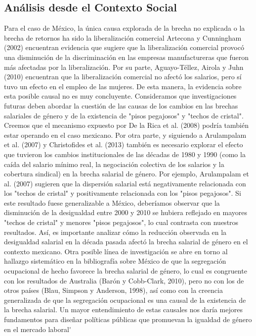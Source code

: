\subsection{An\'alisis desde el Contexto Social}
Para el caso de M\'exico, la \'unica causa explorada de la brecha no explicada o la brecha de retornos ha sido la liberalizaci\'on comercial Artecona y Cunningham (2002) encuentran evidencia que sugiere que la liberalizaci\'on comercial provoc\'o una disminuci\'on de la discriminaci\'on en las empresas manufactureras que fueron más afectadas por la liberalizaci\'on. Por su parte, Aguayo-T\'ellez, Airola y Juhn (2010) encuentran que la liberalizaci\'on comercial no afect\'o los salarios, pero s\'i tuvo un efecto en el empleo de las mujeres. De esta manera, la evidencia sobre esta posible causal no es muy concluyente. Consideramos que investigaciones futuras deben abordar la cuesti\'on de las causas de los cambios en las brechas salariales de g\'enero y de la existencia de "pisos pegajosos" y "techos de cristal". Creemos que el mecanismo expuesto por De la Rica et al. (2008) podr\'ia tambi\'en estar operando en el caso mexicano. Por otra parte, y siguiendo a Arulampalam et al. (2007) y Christofides et al. (2013) tambi\'en es necesario explorar el efecto que tuvieron los cambios institucionales de las d\'ecadas de 1980 y 1990 (como la ca\'ida del salario m\'inimo real, la negociaci\'on colectiva de los salarios y la cobertura sindical) en la brecha salarial de g\'enero. Por ejemplo, Arulampalam et al. (2007) sugieren que la dispersi\'on salarial está negativamente relacionada con los "techos de cristal" y positivamente relacionada con los "pisos pegajosos". Si este resultado fuese generalizable a M\'exico, deber\'iamos observar que la disminuci\'on de la desigualdad entre 2000 y 2010 se hubiera reflejado en mayores "techos de cristal" y menores "pisos pegajosos", lo cual contrasta con nuestros resultados. As\'i, es importante analizar c\'omo la reducci\'on observada en la desigualdad salarial en la d\'ecada pasada afect\'o la brecha salarial de g\'enero en el contexto mexicano. Otra posible l\'inea de investigaci\'on se abre en torno al hallazgo sistemático en la bibliograf\'ia sobre M\'exico de que la segregaci\'on ocupacional de hecho favorece la brecha salarial de g\'enero, lo cual es congruente con los resultados de Australia (Bar\'on y Cobb-Clark, 2010), pero no con los de otros pa\'ises (Blau, Simpson y Anderson, 1998), as\'i como con la creencia generalizada de que la segregaci\'on ocupacional es una causal de la existencia de la brecha salarial. Un mayor entendimiento de estas causales nos dar\'ia mejores fundamentos para diseñar pol\'iticas p\'ublicas que promuevan la igualdad de g\'enero en el mercado laboral\'
